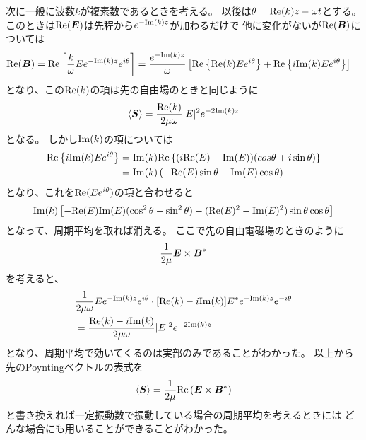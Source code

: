\documentclass[a4paper, 12pt]{jsarticle}
\theoremstyle{definition}
\def\vec#1{\mbox{\boldmath $#1$}}
\renewcommand{\Re}{{\rm Re}}
\renewcommand{\Im}{{\rm Im}}
\begin{document}
次に一般に波数$k$が複素数であるときを考える。
以後は$\theta = \Re(k)z - \omega t$とする。
このときは$\Re(\vec{E})$は先程から$e^{-\Im(k)z}$が加わるだけで
他に変化がないが$\Re(\vec{B})$については
\begin{align}
	\Re(\vec{B}) = \Re \left[ \frac{k}{\omega} E e^{-\Im(k)z}
	e^{i\theta} \right]
	&= \frac{e^{-\Im(k)z}}{\omega} \left[ \Re\left\{ \Re(k) E
	e^{i\theta}\right\} + \Re\left\{ i \Im(k) E
	e^{i\theta} \right\} \right]
\end{align}
となり、この$\Re(k)$の項は先の自由場のときと同じように
\begin{align}
	\left< \vec{S} \right> = \frac{\Re(k)}{2 \mu \omega}
	|E|^2 e^{-2\Im(k)z}
\end{align}
となる。
しかし$\Im(k)$の項については
\begin{align}
	\Re\left\{ i \Im(k) E e^{i\theta} \right\}
	&= \Im(k) \Re \left\{ (i\Re(E) - \Im(E)) 
	(cos \theta + i \sin \theta ) \right\} \\
	&= \Im(k) \left( -\Re(E) \sin \theta - \Im(E) \cos \theta 
	\right)
\end{align}
となり、これを$\Re(Ee^{i\theta})$の項と合わせると
\begin{align}
	\Im(k) \left[-\Re(E)\Im(E)(\cos^2 \theta - \sin^2 \theta) 
	- ( \Re(E)^2 - \Im(E)^2 ) \sin \theta \cos \theta \right]
\end{align}
となって、周期平均を取れば消える。
ここで先の自由電磁場のときのように
\begin{align}
	\frac{1}{2\mu} \vec{E} \times \vec{B}^*
\end{align}
を考えると、
\begin{align}
	&\frac{1}{2\mu \omega} E e^{-\Im(k)z} e^{i\theta} \cdot
	[\Re(k) - i \Im(k)] E^* e^{-\Im(k)z} e^{-i\theta} \\
	&= \frac{\Re(k) - i \Im(k)}{2\mu\omega} |E|^2 e^{-2\Im(k)z}
\end{align}
となり、周期平均で効いてくるのは実部のみであることがわかった。
以上から先のPoyntingベクトルの表式を
\begin{align}
	\left< \vec{S} \right>
	= \frac{1}{2\mu} \Re \left( \vec{E} \times \vec{B}^* \right)
\end{align}
と書き換えれば一定振動数で振動している場合の周期平均を考えるときには
どんな場合にも用いることができることがわかった。
\end{document}
